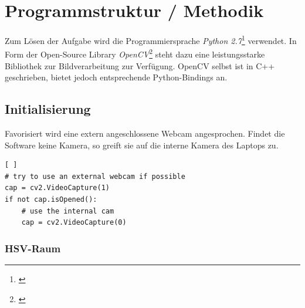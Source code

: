 
\section{Programmstruktur / Methodik}
\label{sec:Programmstruktur}

Zum Lösen der Aufgabe wird die Programmiersprache \emph{Python 2.7}\footnote{\cite{Python}} verwendet. In Form der Open-Source Library \emph{OpenCV}\footnote{\cite{OpenCV}} steht dazu eine leistungsstarke Bibliothek zur Bildverarbeitung zur Verfügung.
OpenCV selbst ist in C++ geschrieben, bietet jedoch entsprechende Python-Bindings an.


\subsection{Initialisierung}

Favorisiert wird eine extern angeschlossene Webcam angesprochen. Findet die Software keine Kamera, so greift sie auf die interne Kamera des Laptops zu. 
\begin{singlespace}
\lstset{language=Python}
\begin{lstlisting}[ ]
# try to use an external webcam if possible
cap = cv2.VideoCapture(1)
if not cap.isOpened():
    # use the internal cam
    cap = cv2.VideoCapture(0)
\end{lstlisting}
\end{singlespace}

\subsubsection{HSV-Raum}

